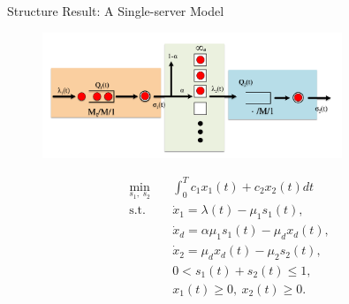 \documentclass[smaller ,table,usenames,dvipsnames]{beamer}
\newcommand{\?}{\stackrel{?}{=}}
\begin{document}
\begin{frame}{Structure Result: A Single-server Model}
    \begin{figure}[h!]
	\centering
	\includegraphics[width=0.8\textwidth]{./Figures/singleserver}
\end{figure}
\vspace{-0.2in}
\begin{align*}
\min_{s_1,\ s_2}\quad & \int_{0}^T c_1x_1(t)+c_2x_2(t)dt \\
\text{s.t.}\quad &\dot{x}_1 = \lambda(t)-\mu_1s_1(t),\\
& \Dot{x}_d = \alpha\mu_1s_1(t)-\mu_dx_d(t),\\
& \Dot{x}_2 = \mu_dx_d(t)-\mu_2s_2(t),\\%
& 0< s_1(t) + s_2(t) \leq 1,\\
& x_1(t) \geq 0,\ x_2(t) \geq 0.
\end{align*}
\end{frame}
\end{document}
